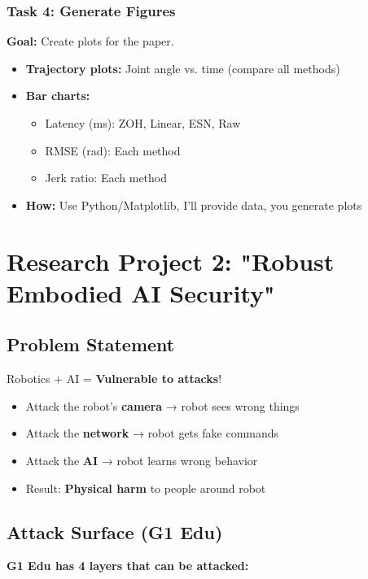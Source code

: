 \documentclass[11pt]{article}
\begin{document}
\subsubsection{Task 4: Generate Figures}
\textbf{Goal:} Create plots for the paper.

\begin{itemize}
    \item \textbf{Trajectory plots:} Joint angle vs. time (compare all methods)
    \item \textbf{Bar charts:} 
    \begin{itemize}
        \item Latency (ms): ZOH, Linear, ESN, Raw
        \item RMSE (rad): Each method
        \item Jerk ratio: Each method
    \end{itemize}
    \item \textbf{How:} Use Python/Matplotlib, I'll provide data, you generate plots
\end{itemize}

\section{Research Project 2: "Robust Embodied AI Security"}

\subsection{Problem Statement}
Robotics + AI = \textbf{Vulnerable to attacks}!

\begin{itemize}
    \item Attack the robot's \textbf{camera} → robot sees wrong things
    \item Attack the \textbf{network} → robot gets fake commands
    \item Attack the \textbf{AI} → robot learns wrong behavior
    \item Result: \textbf{Physical harm} to people around robot
\end{itemize}

\subsection{Attack Surface (G1 Edu)}
\textbf{G1 Edu has 4 layers that can be attacked:}
\end{document}
